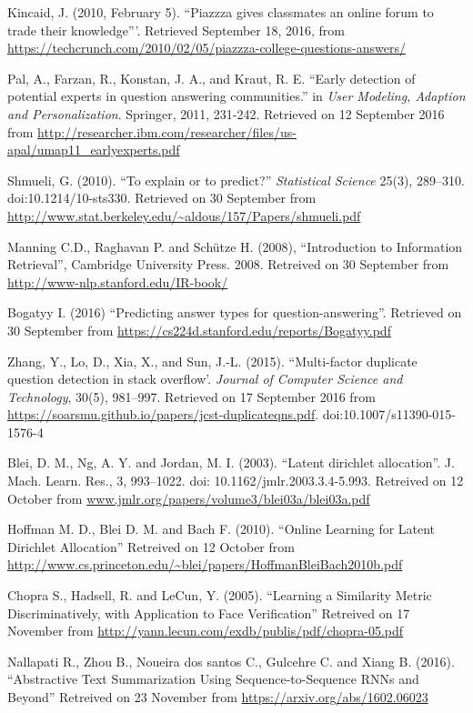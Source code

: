 \documentclass[journal]{IEEEtran}
\begin{document}
\begin{thebibliography}{1}

  
Kincaid, J. (2010, February 5). ``Piazzza gives classmates an online forum to trade their knowledge'''. Retrieved September 18, 2016, from \url{https://techcrunch.com/2010/02/05/piazzza-college-questions-answers/}

Pal, A., Farzan, R., Konstan, J. A., and Kraut, R. E. ``Early detection of potential experts in question answering communities.'' in \emph{User Modeling, Adaption and Personalization}. Springer, 2011, 231-242. Retrieved on 12 September 2016 from \url{http://researcher.ibm.com/researcher/files/us-apal/umap11_earlyexperts.pdf}

Shmueli, G. (2010). ``To explain or to predict?'' \emph{Statistical Science} 25(3), 289–310. doi:10.1214/10-sts330. Retrieved on 30 September from \url{http://www.stat.berkeley.edu/~aldous/157/Papers/shmueli.pdf}

Manning C.D., Raghavan P. and Schütze H. (2008), ``Introduction to Information Retrieval'', Cambridge University Press. 2008. Retreived on 30 September from \url{http://www-nlp.stanford.edu/IR-book/}

Bogatyy I. (2016) ``Predicting answer types for question-answering''. Retrieved on 30 September from \url{https://cs224d.stanford.edu/reports/Bogatyy.pdf}

Zhang, Y., Lo, D., Xia, X., and Sun, J.-L. (2015). ``Multi-factor duplicate question detection in stack overflow'. \emph{Journal of Computer Science and Technology}, 30(5), 981–997. Retrieved on 17 September 2016 from \url{https://soarsmu.github.io/papers/jcst-duplicateqns.pdf}.  doi:10.1007/s11390-015-1576-4

Blei, D. M., Ng, A. Y. and Jordan, M. I. (2003). ``Latent dirichlet allocation''. J. Mach. Learn. Res., 3, 993--1022. doi: 10.1162/jmlr.2003.3.4-5.993. Retreived on 12 October from \url{www.jmlr.org/papers/volume3/blei03a/blei03a.pdf}

Hoffman M. D., Blei D. M. and Bach F. (2010). ``Online Learning for Latent Dirichlet Allocation'' Retreived on 12 October from \url{http://www.cs.princeton.edu/~blei/papers/HoffmanBleiBach2010b.pdf}

Chopra S., Hadsell, R. and LeCun, Y. (2005). ``Learning a Similarity Metric Discriminatively, with Application to Face
Verification'' Retreived on 17 November from \url{http://yann.lecun.com/exdb/publis/pdf/chopra-05.pdf}

Nallapati R., Zhou B., Noueira dos santos C., Gulcehre C. and Xiang B. (2016). ``Abstractive Text Summarization Using Sequence-to-Sequence RNNs and Beyond'' Retreived on 23 November from \url{https://arxiv.org/abs/1602.06023}

\end{thebibliography}
\end{document}
